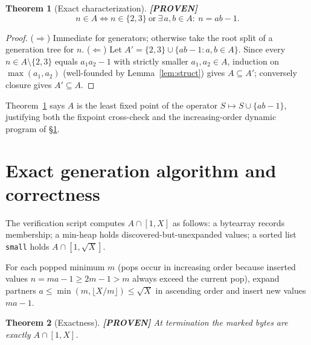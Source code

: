 \documentclass[11pt]{article}
\newtheorem{theorem}{Theorem}
\theoremstyle{definition}
\newcommand{\A}{A}
\begin{document}
\begin{theorem}[Exact characterization]\label{thm:char}\textbf{[PROVEN]}
\[
n\in\A\iff n\in\{2,3\}\ \text{or}\ \exists\,a,b\in\A:\ n=ab-1 .
\]
\end{theorem}

\begin{proof}
($\Rightarrow$) Immediate for generators; otherwise take the root split of a
generation tree for $n$. ($\Leftarrow$) Let $A'=\{2,3\}\cup\{ab-1: a,b\in\A\}$.
Since every $n\in\A\setminus\{2,3\}$ equals $a_1a_2-1$ with strictly smaller
$a_1,a_2\in\A$, induction on $\max(a_1,a_2)$ (well-founded by
Lemma~\ref{lem:struct}) gives $\A\subseteq A'$; conversely closure gives
$A'\subseteq\A$.
\end{proof}

Theorem~\ref{thm:char} says $\A$ is the least fixed point of the operator
$S\mapsto S\cup\{ab-1\}$, justifying both the fixpoint cross-check and the
increasing-order dynamic program of \S\ref{sec:algo}.

\section{Exact generation algorithm and correctness}\label{sec:algo}

The verification script computes $\A\cap[1,X]$ as follows: a bytearray records
membership; a min-heap holds discovered-but-unexpanded values; a sorted list
\texttt{small} holds $\A\cap[1,\sqrt X]$.

For each popped minimum $m$ (pops occur in increasing order because inserted
values $n=ma-1\ge 2m-1>m$ always exceed the current pop), expand partners
$a\le\min(m,\lfloor X/m\rfloor)\le\sqrt X$ in ascending order and insert new
values $ma-1$.

\begin{theorem}[Exactness]\label{thm:exact}\textbf{[PROVEN]}
At termination the marked bytes are exactly $\A\cap[1,X]$.
\end{theorem}
\end{document}
